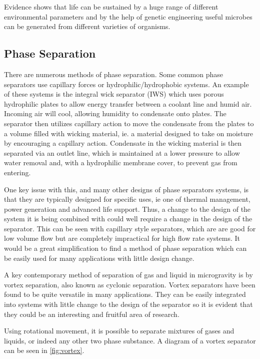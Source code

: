 \documentclass[12pt]{article}
\begin{document}
Evidence shows that life can be sustained by a huge range of different environmental parameters and by the help of genetic engineering useful microbes can be generated from different varieties of organisms.

\subsection{Phase Separation}

There are numerous methods of phase separation. Some common phase separators use capillary forces or hydrophilic/hydrophobic systems. An example of these systems is the integral wick separator (IWS) which uses porous hydrophilic plates to allow energy transfer between a coolant line and humid air. Incoming air will cool, allowing humidity to condensate onto plates. The separator then utilizes capillary action to move the condensate from the plates to a volume filled with wicking material, ie. a material designed to take on moisture by encouraging a capillary action. Condensate in the wicking material is then separated via an outlet line, which is maintained at a lower pressure to allow water removal and, with a hydrophilic membrane cover, to prevent gas from entering.\cite{}

One key issue with this, and many other designs of phase separators systems, is that they are typically designed for specific uses, ie one of thermal management, power generation and advanced life support. Thus, a change to the design of the system it is being combined with could well require a change in the design of the separator. This can be seen with capillary style separators, which are are good for low volume flow but are completely impractical for high flow rate systems. It would be a great simplification to find a method of phase separation which can be easily used for many applications with little design change.

A key contemporary method of separation of gas and liquid in microgravity is by vortex separation, also known as cyclonic separation. Vortex separators have been found to be quite versatile in many applications. They can be easily integrated into systems with little change to the design of the separator so it is evident that they could be an interesting and fruitful area of research.\cite{}

Using rotational movement, it is possible to separate mixtures of gases and liquids, or indeed any other two phase substance. A diagram of a vortex separator can be seen in \cref{fig:vortex}.
\end{document}
